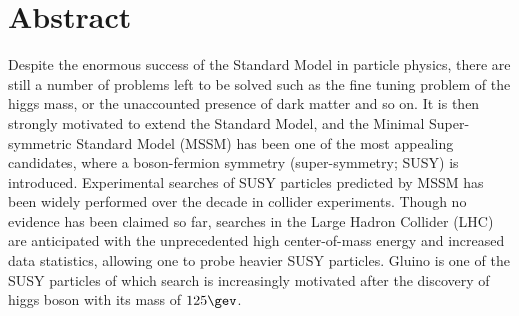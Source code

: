 \setlength{\topmargin}{-1.5cm}
\setlength{\oddsidemargin}{-0.3cm}
\setlength{\evensidemargin}{-0.3cm}
\setlength{\textwidth}{16.5cm}
\setlength{\textheight}{23cm}



%
\chapter*{Abstract} 
\thispagestyle{empty}
Despite the enormous success of the Standard Model in particle physics, there are still a number of problems left to be solved such as the fine tuning problem of the higgs mass, or the unaccounted presence of dark matter and so on.
It is then strongly motivated to extend the Standard Model, and the Minimal Super-symmetric Standard Model (MSSM) has been one of the most appealing candidates, where a boson-fermion symmetry (super-symmetry; SUSY) is introduced. 
Experimental searches of SUSY particles predicted by MSSM has been widely performed over the decade in collider experiments. 
Though no evidence has been claimed so far, searches in the Large Hadron Collider (LHC) are anticipated with the unprecedented high center-of-mass energy and increased data statistics, 
allowing one to probe heavier SUSY particles.
Gluino is one of the SUSY particles of which search is increasingly motivated after the discovery of higgs boson with its mass of $125\gev$.   \\

